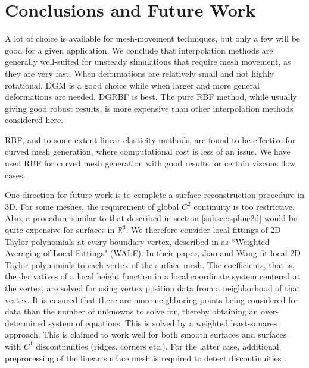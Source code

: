\chapter{Conclusions and Future Work}

A lot of choice is available for mesh-movement techniques, but only a few will be good for a given application. We conclude that interpolation methods are generally well-suited for unsteady simulations that require mesh movement, as they are very fast. When deformations are relatively small and not highly rotational, DGM is a good choice while when larger and more general deformations are needed, DGRBF is best. The pure RBF method, while usually giving good robust results, is more expensive than other interpolation methods considered here. 

RBF, and to some extent linear elasticity methods, are found to be effective for curved mesh generation, where computational cost is less of an issue. We have used RBF for curved mesh generation with good results for certain viscous flow cases.

One direction for future work is to complete a surface reconstruction procedure in 3D. For some meshes, the requirement of global $C^2$ continuity is too restrictive. Also, a procedure similar to that described in section \ref{subsec:spline2d} would be quite expensive for surfaces in $\mathbb{R}^3$. We therefore consider local fittings of 2D Taylor polynomials at every boundary vertex, described in \cite{sr:jiaowang} as ``Weighted Averaging of Local Fittings" (WALF). In their paper, Jiao and Wang fit local 2D Taylor polynomials to each vertex of the surface mesh. The coefficients, that is, the derivatives of a local height function in a local coordinate system centered at the vertex, are solved for using vertex position data from a neighborhood of that vertex. It is ensured that there are more neighboring points being considered for data than the number of unknowns to solve for, thereby obtaining an over-determined system of equations. This is solved by a weighted least-squares approach. This is claimed to work well for both smooth surfaces and surfaces with $C^1$ discontinuities (ridges, corners etc.). For the latter case, additional preprocessing of the linear surface mesh is required to detect discontinuities \cite{sr:discontinuities}.
